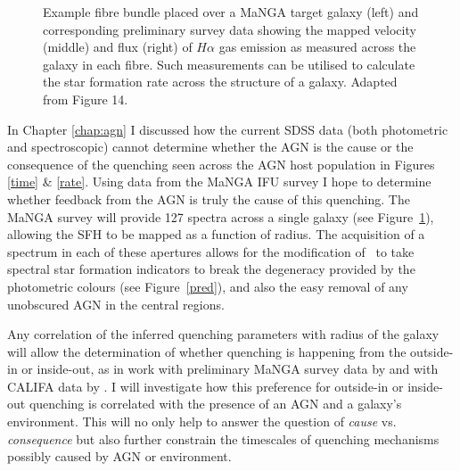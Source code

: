 \begin{figure}
\caption[Example MaNGA fibre bundle on a target galaxy with example emission data]{Example fibre bundle placed over a MaNGA target galaxy (left) and corresponding preliminary survey data showing the mapped velocity (middle) and flux (right) of $H\alpha$ gas emission as measured across the galaxy in each fibre. Such measurements can be utilised to calculate the star formation rate across the structure of a galaxy. Adapted from \cite{bundy15} Figure 14.}
\label{fig:manga}
\end{figure}

In Chapter \ref{chap:agn} I discussed how the current SDSS data (both photometric and spectroscopic) cannot determine whether the AGN is the cause or the consequence of the quenching seen across the AGN host population in Figures \ref{time} \& \ref{rate}. Using data from the MaNGA IFU survey \citep{bundy15} I hope to determine whether feedback from the AGN is truly the cause of this quenching. The MaNGA survey will provide 127 spectra across a single galaxy (see Figure~\ref{fig:manga}), allowing the SFH to be mapped as a function of radius. The acquisition of a spectrum in each of these apertures allows for the modification of \starpy\ to take spectral star formation indicators \citep[such as $H\alpha$][]{kennicutt94} to break the degeneracy provided by the photometric colours (see Figure~\ref{pred}), and also the easy removal of any unobscured AGN in the central regions. 

Any correlation of the inferred quenching parameters with radius of the galaxy will allow the determination of whether quenching is happening from the outside-in \citep[i.e. due to the environment, as in][]{pan15, clarke16, schaefer17} or inside-out, as in work with preliminary MaNGA survey data by \citet{belfiore16} and with CALIFA data by \citet{gonzalez16}. I will investigate how this preference for outside-in or inside-out quenching is correlated with the presence of an AGN and a galaxy's environment. This will no only help to answer the question of \emph{cause} vs. \emph{consequence} but also further constrain the timescales of quenching mechanisms possibly caused by AGN or environment. 

